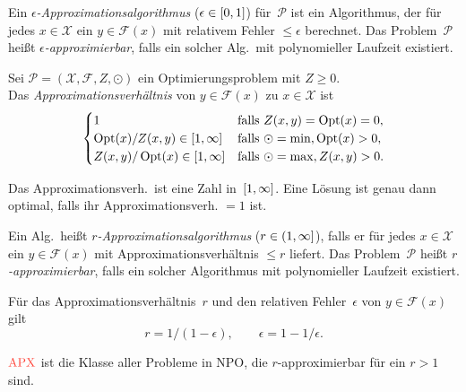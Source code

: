 \documentclass{cheat-sheet}
\newcommand{\Instances}{\mathcal{X}} %
\newcommand{\Feasible}{\mathcal{F}} %
\newcommand{\ObjFun}{Z} %
\newcommand{\Goal}{\odot} %
\newcommand{\OptTuple}{(\Instances{}, \Feasible{}, \ObjFun{}, \Goal)} %
\DeclareMathOperator{\Opt}{Opt} %
\DeclareMathOperator{\APX}{APX} %
\newcommand{\Prob}{\mathcal{P}} %
\newcommand{\Defn}[1]{\textcolor{DefinitionColor}{#1}}
\begin{document}
\begin{defn}
  Ein \emph{$\epsilon$-Approximationsalgorithmus} ($\epsilon \in \left[ 0, 1 \right]$) für~$\Prob$ ist ein Algorithmus, der für jedes $x \in \Instances$ ein $y \in \Feasible(x)$ mit relativem Fehler $\leq \epsilon$ berechnet.
  Das Problem~$\Prob$ heißt \emph{$\epsilon$-approximierbar}, falls ein solcher Alg.\ mit polynomieller Laufzeit existiert.
\end{defn}

\begin{defn}
  Sei $\Prob = \OptTuple$ ein Optimierungsproblem mit $Z \geq 0$. \\
  Das \emph{Approximationsverhältnis} von $y \in \Feasible(x)$ zu $x \in \Instances$ ist
  \[
    \begin{cases}
      1 & \text{falls } \ObjFun(x, y) = \Opt(x) = 0, \\
      \Opt(x) / \ObjFun(x, y) \in \cinterval{1}{\infty} & \text{falls } \Goal = \min, \Opt(x) > 0, \\
      \ObjFun(x, y) / \Opt(x) \in \cinterval{1}{\infty} & \text{falls } \Goal = \max, \ObjFun(x, y) > 0.
    \end{cases}
  \]
\end{defn}

\begin{bem}
  Das Approximationsverh.\ ist eine Zahl in~$\left[ 1, \infty \right]$.
  Eine Lösung ist genau dann optimal, falls ihr Approximationsverh. $= 1$ ist.
\end{bem}

\begin{defn}
  Ein Alg.\ heißt \emph{$r$-Approximationsalgorithmus} ($r \in \left( 1, \infty \right]$), falls er für jedes $x \in \Instances$ ein $y \in \Feasible(x)$ mit Approximationsverhältnis $\leq r$ liefert.
  Das Problem~$\Prob$ heißt \emph{$r$-approximierbar}, falls ein solcher Algorithmus mit polynomieller Laufzeit existiert.
\end{defn}

\begin{bem}
  Für das Approximationsverhältnis~$r$ und den relativen Fehler~$\epsilon$ von $y \in \Feasible(x)$ gilt
  \[
    r = 1 / (1-\epsilon), \qquad
    \epsilon = 1 - 1/\epsilon.
  \]
\end{bem}

\begin{defn}
  $\Defn{\APX}$ ist die Klasse aller Probleme in NPO, die $r$-approximierbar für ein $r > 1$ sind.
\end{defn}
\end{document}
